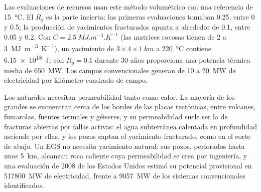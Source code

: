 Las evaluaciones de recursos usan este método volumétrico con una referencia de \qty{15}{\celsius}. El  $R_g$ es la parte incierta: las primeras evaluaciones tomaban 0.25, entre 0 y 0.5; la producción de
yacimientos fracturados apunta a alrededor de 0.1, entre 0.05 y 0.2. Con $C = \qty{2.5}{MJ.m^{-3}.K^{-1}}$
(las matrices rocosas tienen de 2 a \qty{3}{MJ.m^{-3}.K^{-1}}), un yacimiento de $3 \times 4 \times
\qty{1}{km}$ a \qty{220}{\celsius} contiene \qty{6.15e18}{J}; con $R_g = 0.1$ durante 30 años
proporciona una potencia térmica media de \qty{650}{MW}. Los campos convencionales generan de 10 a
\qty{20}{MW} de electricidad por kilómetro cuadrado de campo.

Los  naturales necesitan permeabilidad tanto como calor. La mayoría de los grandes se encuentran cerca de los
bordes de las placas tectónicas, entre volcanes, fumarolas, fuentes termales y géiseres, y su
permeabilidad suele ser la de fracturas abiertas por fallas activas: el agua subterránea calentada en profundidad
asciende por ellas, y los pozos captan el yacimiento fracturado, como en el corte de abajo. Un EGS no necesita yacimiento natural:
sus pozos, perforados hasta unos \qty{5}{km}, alcanzan roca caliente cuya permeabilidad se crea por ingeniería, y
una evaluación de 2008 de los Estados Unidos estimó su potencial provisional en \qty{517800}{MW} de
electricidad, frente a \qty{9057}{MW} de los sistemas convencionales identificados.

